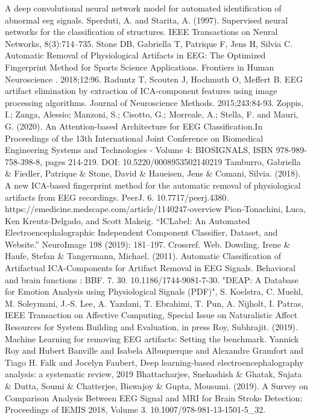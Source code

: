 \documentclass[12pt, a4paper, titlepage]{extreport}
\begin{document}
\begin{thebibliography}{00}
			A deep convolutional neural network model for automated identification of abnormal eeg signals.
			Sperduti, A. and Starita, A. (1997). Supervised neural networks for the classification of structures. IEEE Transactions on Neural Networks, 8(3):714–735.
			Stone DB, Gabriella T, Patrique F, Jens H, Silvia C. Automatic Removal of Physiological Artifacts in EEG: The Optimized Fingerprint Method for Sports Science Applications. Frontiers in Human Neuroscience . 2018;12:96.
			Raduntz T, Scouten J, Hochmuth O, Meffert B. EEG artifact elimination by extraction of ICA-component features
			using image processing algorithms. Journal of Neuroscience Methods. 2015;243:84-93.
			Zoppis, I.; Zanga, Alessio; Manzoni, S.; Cisotto, G.; Morreale, A.; Stella, F. and Mauri, G. (2020). An Attention-based Architecture for EEG Classification.In Proceedings of the 13th International Joint Conference on Biomedical Engineering Systems and Technologies - Volume 4: BIOSIGNALS, ISBN 978-989-758-398-8, pages 214-219. DOI: 10.5220/0008953502140219
			Tamburro, Gabriella \& Fiedler, Patrique \& Stone, David \& Haueisen, Jens \& Comani, Silvia. (2018). A new ICA-based fingerprint method for the automatic removal of physiological artifacts from EEG recordings. PeerJ. 6. 10.7717/peerj.4380. 
			https://emedicine.medscape.com/article/1140247-overview
			Pion-Tonachini, Luca, Ken Kreutz-Delgado, and Scott Makeig. “ICLabel: An Automated Electroencephalographic Independent Component Classifier, Dataset, and Website.” NeuroImage 198 (2019): 181–197. Crossref. Web.
			Dowding, Irene \& Haufe, Stefan \& Tangermann, Michael. (2011). Automatic Classification of Artifactual ICA-Components for Artifact Removal in EEG Signals. Behavioral and brain functions : BBF. 7. 30. 10.1186/1744-9081-7-30. 
			 "DEAP: A Database for Emotion Analysis using Physiological Signals (PDF)", S. Koelstra, C. Muehl, M. Soleymani, J.-S. Lee, A. Yazdani, T. Ebrahimi, T. Pun, A. Nijholt, I. Patras, IEEE Transaction on Affective Computing, Special Issue on Naturalistic Affect Resources for System Building and Evaluation, in press
			 Roy, Subhrajit. (2019). Machine Learning for removing EEG artifacts: Setting the benchmark. 
			Yannick Roy and Hubert Banville and Isabela Albuquerque and Alexandre Gramfort and Tiago H. Falk and Jocelyn Faubert, Deep learning-based electroencephalography analysis: a systematic review, 2019
			Bhattacharjee, Snehashish \& Ghatak, Sujata \& Dutta, Soumi \& Chatterjee, Biswajoy \& Gupta, Mousumi. (2019). A Survey on Comparison Analysis Between EEG Signal and MRI for Brain Stroke Detection: Proceedings of IEMIS 2018, Volume 3. 10.1007/978-981-13-1501-5\_32. 

\end{thebibliography}
\end{document}
